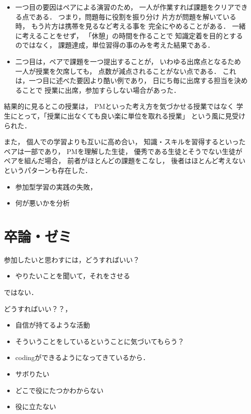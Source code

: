 \documentclass{hissymp}
\begin{document}
\begin{itemize}
\item 一つ目の要因はペアによる演習のため，
一人が作業すれば課題をクリアできる点である．
つまり，問題毎に役割を振り分け 
片方が問題を解いている時，
もう片方は携帯を見るなど考える事を
完全にやめることがある．
一緒に考えることをせず，
「休憩」の時間を作ることで
知識定着を目的とするのではなく，
課題達成，単位習得の事のみを考えた結果である．

\item 二つ目は，ペアで課題を一つ提出することが，
いわゆる出席点となるため
一人が授業を欠席しても，
点数が減点されることがない点である．
これは，一つ目に述べた要因より酷い例であり，
日にち毎に出席する担当を決めることで
授業に出席，参加すらしない場合があった．
\end{itemize}

結果的に見るとこの授業は，
PMといった考え方を気づかせる授業ではなく
学生にとって，「授業に出なくても良い楽に単位を取れる授業」
という風に見受けられた．

また，
個人での学習よりも互いに高め合い，
知識・スキルを習得するといったペアは一部であり，
PMを理解した生徒，
優秀である生徒とそうでない生徒がペアを組んだ場合，
前者がほとんどの課題をこなし，
後者はほとんど考えないというパターンも存在した．

\begin{itemize}
\item 参加型学習の実践の失敗，
\item 何が悪いかを分析
\end{itemize}


\section{卒論・ゼミ}
\label{sec:org36569c3}
参加したいと思わすには，どうすればいい？

\begin{itemize}
\item やりたいことを聞いて，それをさせる
\end{itemize}
ではない．

どうすればいい？？，
\begin{itemize}
\item 自信が持てるような活動
\item そういうことをしているということに気づいてもらう？
\item codingができるようになってきているから．

\item サボりたい
\item どこで役にたつかわからない
\item 役に立たない
\end{itemize}
\end{document}
